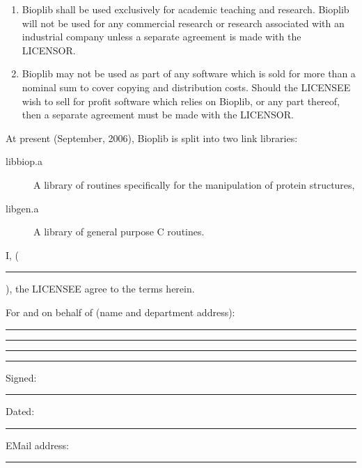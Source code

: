 \documentclass[12pt]{article}
\newcommand{\licensee}{\rule{5.3in}{0.5pt}\mbox{}}
\begin{document}
\begin{enumerate}
\item Bioplib shall be used exclusively for academic teaching and
research. Bioplib will not be used for any commercial research or
research associated with an industrial company unless a separate 
agreement is made with the LICENSOR.

\item Bioplib may not be used as part of any software which is sold
for more than a nominal sum to cover copying and distribution
costs. Should the LICENSEE wish to sell for profit software which
relies on Bioplib, or any part thereof, then a separate agreement must
be made with the LICENSOR.

\end{enumerate}
\newpage


\noindent At present (September, 2006), Bioplib is split into two link libraries:
\begin{description}
\item[libbiop.a] A library of routines specifically for the
manipulation of protein structures,
\item[libgen.a] A library of general purpose C routines.
\end{description}

\vspace{0.5in}


\noindent I, (\licensee), the LICENSEE agree to the terms herein.

\noindent For and on behalf of (name and department address):\\
\vskip 0.25in
\noindent\rule{5in}{0.5pt}
\vskip 0.25in
\noindent\rule{5in}{0.5pt}
\vskip 0.25in
\noindent\rule{5in}{0.5pt}
\vskip 0.25in
\noindent\rule{5in}{0.5pt}
\vskip 0.25in

\noindent Signed: \rule{3in}{0.5pt}
\vskip 0.25in

\noindent Dated: \rule{3in}{0.5pt}
\vskip 0.25in

\noindent EMail address: \rule{3in}{0.5pt}
\end{document}
